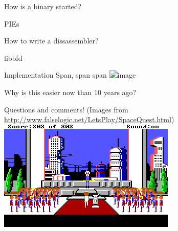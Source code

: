 \documentclass{beamer}
\begin{document}
\begin{frame}{How is a binary started?}
\end{frame}

\begin{frame}{PIEs}
\end{frame}

\begin{frame}{How to write a dissassembler?}
\end{frame}

\begin{frame}{libbfd}
\end{frame}

\begin{frame}{Implementation}
    Span, span span
    \includegraphics<2>[height=4cm]{spam}
\end{frame}

\begin{frame}{Why is this easier now than 10 years ago?}
\end{frame}




\begin{frame}{Questions and comments!}
  \footnotesize
  (Images from \url{http://www.falselogic.net/LetsPlay/SpaceQuest.html})
  \includegraphics[width=\linewidth]{sq_final}
\end{frame}
\end{document}
